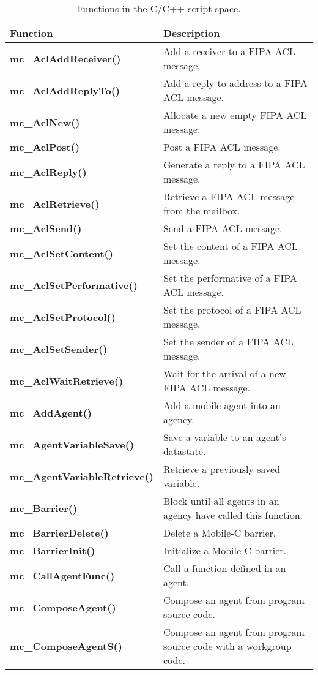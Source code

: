 \begin{table}[!h]
\capstart
\begin{center}
\caption{Functions in the C/C++ script space.}
\begin{tabular}{p{63 mm}p{97 mm}}
\hline
Function & Description \\
\hline
{\bf mc\_AclAddReceiver()} & Add a receiver to a FIPA ACL message. \\
{\bf mc\_AclAddReplyTo()} & Add a reply-to address to a FIPA ACL message. \\
{\bf mc\_AclNew()} & Allocate a new empty FIPA ACL message. \\
{\bf mc\_AclPost()} & Post a FIPA ACL message. \\
{\bf mc\_AclReply()} & Generate a reply to a FIPA ACL message. \\
{\bf mc\_AclRetrieve()} & Retrieve a FIPA ACL message from the mailbox. \\
{\bf mc\_AclSend()} & Send a FIPA ACL message. \\
{\bf mc\_AclSetContent()} & Set the content of a FIPA ACL message. \\
{\bf mc\_AclSetPerformative()} & Set the performative of a FIPA ACL message. \\
{\bf mc\_AclSetProtocol()} & Set the protocol of a FIPA ACL message. \\
{\bf mc\_AclSetSender()} & Set the sender of a FIPA ACL message.\\
{\bf mc\_AclWaitRetrieve()} & Wait for the arrival of a new FIPA ACL message. \\
{\bf mc\_AddAgent()} & Add a mobile agent into an agency. \\
{\bf mc\_AgentVariableSave()} & Save a variable to an agent's datastate. \\
{\bf mc\_AgentVariableRetrieve()} & Retrieve a previously saved variable. \\
{\bf mc\_Barrier()} & Block until all agents in an agency have called this function. \\
{\bf mc\_BarrierDelete()} & Delete a Mobile-C barrier. \\
{\bf mc\_BarrierInit()} & Initialize a Mobile-C barrier. \\
{\bf mc\_CallAgentFunc()} & Call a function defined in an agent. \\
{\bf mc\_ComposeAgent()} & Compose an agent from program source code. \\
{\bf mc\_ComposeAgentS()} & Compose an agent from program source code with a workgroup code. \\

\end{tabular}
\end{center}
\end{table}
